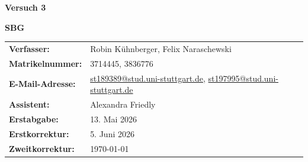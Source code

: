 \documentclass[11pt]{scrartcl} %
\begin{document}
\begin{titlepage}
  \begin{center}
    \vspace*{2cm}
    \begin{LARGE}
      \vspace*{1cm}
      \textbf{\textsf{Versuch 3 \\}}
    \end{LARGE}
    \vspace*{1cm}
    \textbf{\textsf{SBG}}\\
    \vspace*{1.5cm}
    \begin{table}[H]
      \sffamily
      \hspace*{3cm}
      \begin{tabular}{>{\bfseries}p{4cm}p{8cm}}
        Verfasser:      & Robin Kühnberger, Felix Naraschewski                                                                                                                       \\
        Matrikelnummer: & 3714445, 3836776                                                                                                                                           \\
        E-Mail-Adresse: & \href{mailto:st189389@stud.uni-stuttgart.de}{st189389@stud.uni-stuttgart.de}, \href{mailto:st197995@stud.uni-stuttgart.de}{st197995@stud.uni-stuttgart.de} \\
        Assistent:      & Alexandra Friedly                                                                                                                                          \\
        Erstabgabe:     & 13. Mai 2026                                                                                                                                               \\
        Erstkorrektur:  & 5. Juni 2026                                                                                                                                               \\
        Zweitkorrektur: & \today
      \end{tabular}
    \end{table}
  \end{center}
\end{titlepage}
\pagestyle{empty}        %
\tableofcontents
\clearpage               %
\pagestyle{scrheadings}  %





\newpage
{}

\printbibliography
\end{document}
